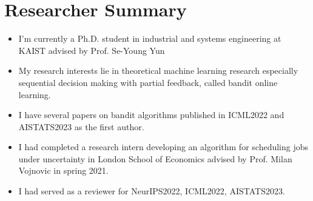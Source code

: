\section{Researcher Summary}
\begin{itemize}[nosep, wide=0pt]
    \item  I'm currently a Ph.D. student in industrial and systems engineering at KAIST advised by Prof. Se-Young Yun
    \item  My research interests lie in theoretical machine learning research especially sequential decision making with partial feedback, called bandit online learning.
    \item  I have several papers on bandit algorithms published in ICML2022 and AISTATS2023 as the first author.
    \item  I had completed a research intern developing an algorithm for scheduling jobs under uncertainty in London School of Economics advised by Prof. Milan Vojnovic in spring 2021.
    \item  I had served as a reviewer for NeurIPS2022, ICML2022, AISTATS2023.
\end{itemize}
